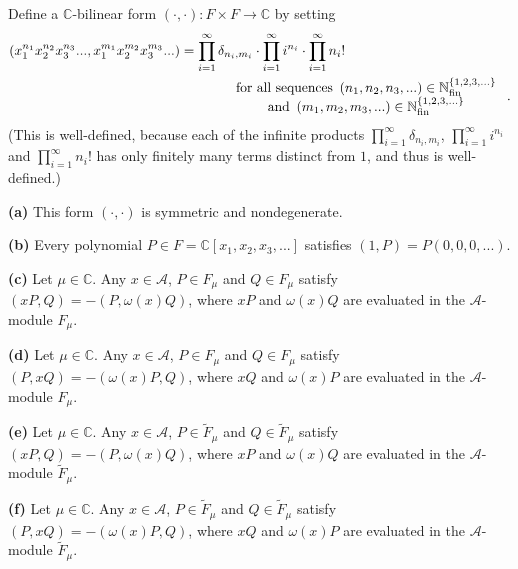 \documentclass[etingof-lie.tex]{subfiles}
\begin{document}
\begin{proposition}
\label{prop.A.contravariantform}Define a $\mathbb{C}$-bilinear form $\left(
\cdot,\cdot\right)  :F\times F\rightarrow\mathbb{C}$ by setting%
\begin{align*}
\left(  x_{1}^{n_{1}}x_{2}^{n_{2}}x_{3}^{n_{3}}...,x_{1}^{m_{1}}x_{2}^{m_{2}%
}x_{3}^{m_{3}}...\right)   &  =\prod\limits_{i=1}^{\infty}\delta_{n_{i},m_{i}%
}\cdot\prod\limits_{i=1}^{\infty}i^{n_{i}}\cdot\prod\limits_{i=1}^{\infty
}n_{i}!\\
&  \ \ \ \ \ \ \ \ \ \ \left.
\begin{array}
[c]{c}%
\text{for all sequences }\left(  n_{1},n_{2},n_{3},...\right)  \in
\mathbb{N}_{\operatorname*{fin}}^{\left\{  1,2,3,...\right\}  }\\
\text{and }\left(  m_{1},m_{2},m_{3},...\right)  \in\mathbb{N}%
_{\operatorname*{fin}}^{\left\{  1,2,3,...\right\}  }%
\end{array}
\right.  .
\end{align*}
(This is well-defined, because each of the infinite products $\prod
\limits_{i=1}^{\infty}\delta_{n_{i},m_{i}}$, $\prod\limits_{i=1}^{\infty
}i^{n_{i}}$ and $\prod\limits_{i=1}^{\infty}n_{i}!$ has only finitely many
terms distinct from $1$, and thus is well-defined.)

\textbf{(a)} This form $\left(  \cdot,\cdot\right)  $ is symmetric and nondegenerate.

\textbf{(b)} Every polynomial $P\in F=\mathbb{C}\left[  x_{1},x_{2}%
,x_{3},...\right]  $ satisfies $\left(  1,P\right)  =P\left(
0,0,0,...\right)  $.

\textbf{(c)} Let $\mu\in\mathbb{C}$. Any $x\in\mathcal{A}$, $P\in F_{\mu}$ and
$Q\in F_{\mu}$ satisfy $\left(  xP,Q\right)  =-\left(  P,\omega\left(
x\right)  Q\right)  $, where $xP$ and $\omega\left(  x\right)  Q$ are
evaluated in the $\mathcal{A}$-module $F_{\mu}$.

\textbf{(d)} Let $\mu\in\mathbb{C}$. Any $x\in\mathcal{A}$, $P\in F_{\mu}$ and
$Q\in F_{\mu}$ satisfy $\left(  P,xQ\right)  =-\left(  \omega\left(  x\right)
P,Q\right)  $, where $xQ$ and $\omega\left(  x\right)  P$ are evaluated in the
$\mathcal{A}$-module $F_{\mu}$.

\textbf{(e)} Let $\mu\in\mathbb{C}$. Any $x\in\mathcal{A}$, $P\in
\widetilde{F}_{\mu}$ and $Q\in\widetilde{F}_{\mu}$ satisfy $\left(
xP,Q\right)  =-\left(  P,\omega\left(  x\right)  Q\right)  $, where $xP$ and
$\omega\left(  x\right)  Q$ are evaluated in the $\mathcal{A}$-module
$\widetilde{F}_{\mu}$.

\textbf{(f)} Let $\mu\in\mathbb{C}$. Any $x\in\mathcal{A}$, $P\in
\widetilde{F}_{\mu}$ and $Q\in\widetilde{F}_{\mu}$ satisfy $\left(
P,xQ\right)  =-\left(  \omega\left(  x\right)  P,Q\right)  $, where $xQ$ and
$\omega\left(  x\right)  P$ are evaluated in the $\mathcal{A}$-module
$\widetilde{F}_{\mu}$.
\end{proposition}
\end{document}
